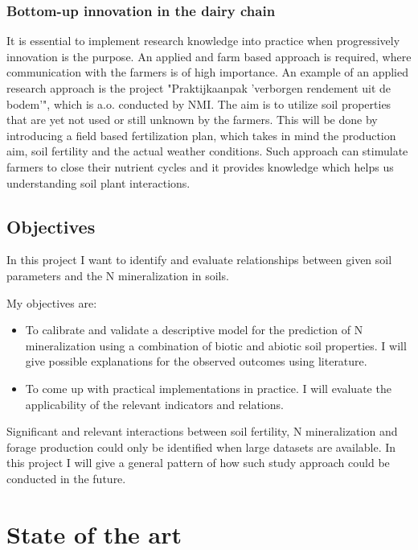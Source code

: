 \documentclass[10pt,twoside,dutch,english]{report}
\begin{document}
		\subsection{Bottom-up innovation in the dairy chain}
		 It is essential to implement research knowledge into practice when progressively innovation is the purpose. An applied and farm based approach is required, where communication with the farmers is of high importance. An example of an applied research approach is the project "Praktijkaanpak 'verborgen rendement uit de bodem'", which is a.o. conducted by NMI. The aim is to utilize soil properties that are yet not used or still unknown by the farmers. This will be done by introducing a field based fertilization plan, which takes in mind the production aim, soil fertility and the actual weather conditions. Such approach can stimulate farmers to close their nutrient cycles and it provides knowledge which helps us understanding soil plant interactions. 
		
	\section{Objectives}
			In this project I want to identify and evaluate relationships between given soil parameters and the N mineralization in soils.
			
			
			My objectives are:
			\begin{itemize}
				\item   To calibrate and validate a descriptive model for the prediction of N mineralization using a combination of biotic and abiotic soil properties. I will give possible explanations for the observed outcomes using literature.
				\item	To come up with practical implementations in practice. I will evaluate the applicability of the relevant indicators and relations.
				
			\end{itemize}
			
			Significant and relevant interactions between soil fertility, N mineralization and forage production could only be identified when large datasets are available. In this project I will give a general pattern of how such study approach could be conducted in the future. 
			


\chapter{State of the art} %
	\label{chap: state of the art}
\end{document}
